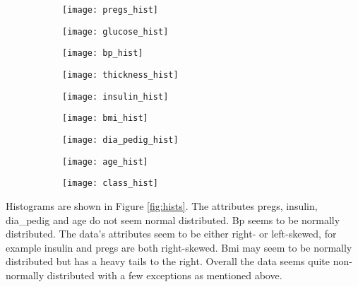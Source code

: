 \begin{figure}
  \centering{}
  \caption{Histograms of attributes}\label{fig:hists}
  \begin{subfigure}{0.3\textwidth}
    \texttt{[image: pregs\_hist]}
  \end{subfigure}
  \begin{subfigure}{0.3\textwidth}
    \texttt{[image: glucose\_hist]}
  \end{subfigure}
  \begin{subfigure}{0.3\textwidth}
    \texttt{[image: bp\_hist]}
  \end{subfigure}

  \begin{subfigure}{0.3\textwidth}
    \texttt{[image: thickness\_hist]}
  \end{subfigure}
  \begin{subfigure}{0.3\textwidth}
    \texttt{[image: insulin\_hist]}
  \end{subfigure}
  \begin{subfigure}{0.3\textwidth}
    \texttt{[image: bmi\_hist]}
  \end{subfigure}

  \begin{subfigure}{0.3\textwidth}
    \texttt{[image: dia\_pedig\_hist]}
  \end{subfigure}
  \begin{subfigure}{0.3\textwidth}
    \texttt{[image: age\_hist]}
  \end{subfigure}
  \begin{subfigure}{0.3\textwidth}
    \texttt{[image: class\_hist]}
  \end{subfigure}
\end{figure}

Histograms are shown in Figure \ref{fig:hists}. The attributes pregs, insulin, dia\_pedig
and age do not seem normal distributed. Bp seems to be normally distributed.
The data's attributes seem to be either right- or left-skewed, for example insulin and pregs
are both right-skewed. Bmi may seem to be normally distributed but has a
heavy tails to the right.
Overall the data seems quite non-normally distributed with a few exceptions as mentioned above.

